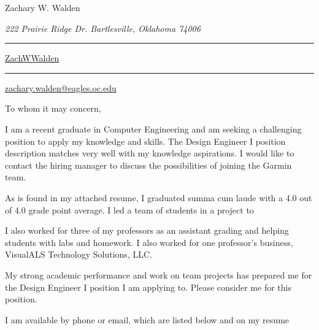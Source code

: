\documentclass{article}
\newcommand\mybar{\kern1pt\rule[-\dp\strutbox]{.8pt}{\baselineskip}\kern1pt}
\begin{document}

\begin{center}
	\begin{Huge}
		Zachary W. Walden\\
	\end{Huge}
	\begin{large}
		\textsl{222 Prairie Ridge Dr. Bartlesville, Oklahoma 74006}\\
	\end{large}
	\begin{normalsize}
		 \mybar { } \faGithub \href{https://github.com/ZachWWalden}{ ZachWWalden}
		\mybar { }\faEnvelope\href{mailto::zachary.walden@eagles.oc.edu}{ zachary.walden@eagles.oc.edu}
	\end{normalsize}
\end{center}
\begin{spacing}{1.25}
\vspace*{\fill}
To whom it may concern,

I am a recent graduate in Computer Engineering and am seeking a challenging position to apply my knowledge and skills.  The Design Engineer I position description matches very well with my knowledge aspirations.  I would like to contact the hiring manager to discuss the possibilities of joining the Garmin team.

As is found in my attached resume, I graduated summa cum laude with a 4.0 out of 4.0 grade point average.  I led a team of students in a project to

I also worked for three of my professors as an assistant grading and helping students with labs and homework.  I also worked for one professor’s business, VisualALS Technology Solutions, LLC.

My strong academic performance and work on team projects has prepared me for the Design Engineer I position I am applying to.  Please consider me for this position.

I am available by phone or email, which are listed below and on my resume
\vspace*{\fill}
\end{spacing}

\newpage

\restoregeometry
\end{document}
